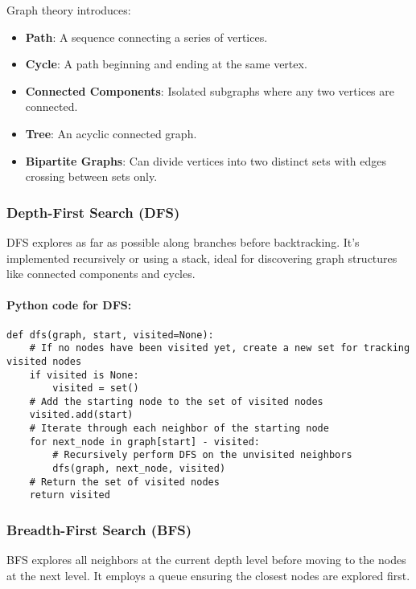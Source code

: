 \documentclass{article}
\begin{document}
Graph theory introduces:
\begin{itemize}
    \item \textbf{Path}: A sequence connecting a series of vertices.
    \item \textbf{Cycle}: A path beginning and ending at the same vertex.
    \item \textbf{Connected Components}: Isolated subgraphs where any two vertices are connected.
    \item \textbf{Tree}: An acyclic connected graph.
    \item \textbf{Bipartite Graphs}: Can divide vertices into two distinct sets with edges crossing between sets only.
\end{itemize}


\subsubsection{Depth-First Search (DFS)}
DFS explores as far as possible along branches before backtracking. It's implemented recursively or using a stack, ideal for discovering graph structures like connected components and cycles.

\paragraph{Python code for DFS:}
\begin{verbatim}
def dfs(graph, start, visited=None):
    # If no nodes have been visited yet, create a new set for tracking visited nodes
    if visited is None:
        visited = set()
    # Add the starting node to the set of visited nodes
    visited.add(start)
    # Iterate through each neighbor of the starting node
    for next_node in graph[start] - visited:
        # Recursively perform DFS on the unvisited neighbors
        dfs(graph, next_node, visited)
    # Return the set of visited nodes
    return visited
\end{verbatim}

\subsubsection{Breadth-First Search (BFS)}
BFS explores all neighbors at the current depth level before moving to the nodes at the next level. It employs a queue ensuring the closest nodes are explored first.
\end{document}
